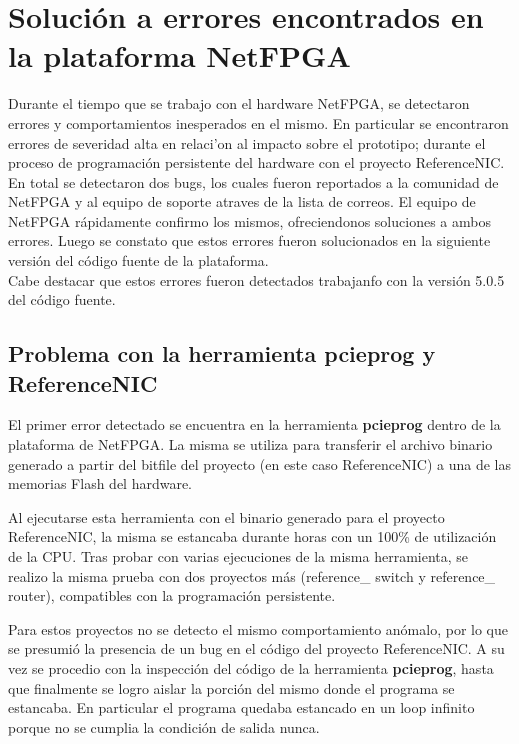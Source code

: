 \chapter{Soluci\'on a errores encontrados en la plataforma NetFPGA} 

Durante el tiempo que se trabajo con el hardware NetFPGA, se detectaron errores y comportamientos inesperados en el mismo. En particular se encontraron errores de severidad alta en relaci'on al  impacto sobre el prototipo; durante el proceso de programaci\'on persistente del hardware con el proyecto ReferenceNIC.\\

En total se detectaron dos bugs, los cuales fueron reportados a la comunidad de NetFPGA y al equipo de soporte atraves de la lista de correos. El equipo de NetFPGA r\'apidamente confirmo los mismos,
ofreciendonos soluciones a ambos errores. Luego se constato que estos errores fueron solucionados en la siguiente versi\'on del c\'odigo fuente de la plataforma.\\ 

Cabe destacar que estos errores fueron detectados trabajanfo con la versi\'on 5.0.5 del c\'odigo fuente.
 
\section*{Problema con la herramienta pcieprog y ReferenceNIC}
El primer error detectado se encuentra en la herramienta \textbf{pcieprog} dentro de la plataforma de NetFPGA. La misma se utiliza para transferir el archivo binario generado a partir del bitfile del proyecto (en este caso ReferenceNIC) a una de las memorias Flash del hardware.

Al ejecutarse esta herramienta con el binario generado para el proyecto ReferenceNIC, la misma se estancaba durante horas con un 100\% de utilizaci\'on de la CPU. Tras probar con varias ejecuciones de la misma herramienta, se realizo la misma prueba con dos proyectos m\'as (reference\_ switch y reference\_ router), compatibles con la programaci\'on persistente. 

Para estos proyectos no se detecto el mismo comportamiento an\'omalo, por lo que se presumi\'o la presencia de un bug en el c\'odigo del proyecto ReferenceNIC. A su vez se procedio con la inspecci\'on del c\'odigo de la herramienta \textbf{pcieprog}, hasta que finalmente se logro aislar la porci\'on del mismo donde el programa se estancaba. En particular el programa quedaba estancado en un loop infinito porque no se cumplia la condici\'on de salida nunca.\\ 

